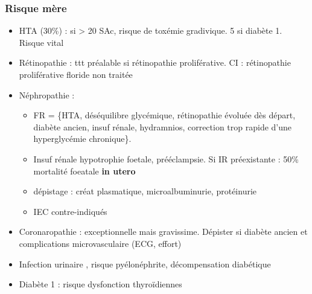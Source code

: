 \documentclass{book}
\begin{document}
\subsubsection{Risque mère}
\label{sec:org6f3645c}
\begin{itemize}
\item HTA (30\%) : si > 20 SAc, risque de toxémie gradivique. \texttimes{}5 si
diabète 1. Risque vital \faBomb
\item Rétinopathie : ttt préalable si rétinopathie proliférative. CI : rétinopathie
proliférative floride non traitée
\item Néphropathie : 
\begin{itemize}
\item FR = \{HTA, déséquilibre glycémique, rétinopathie évoluée dès
départ, diabète ancien, insuf rénale, hydramnios, correction trop rapide d'une
hyperglycémie chronique\}.
\item Insuf rénale \thus hypotrophie foetale, prééclampsie. Si IR préexistante : 50\%
mortalité foeatale \textbf{in utero}
\item dépistage : créat plasmatique, microalbuminurie, protéinurie
\item IEC contre-indiqués
\end{itemize}
\item Coronaropathie : exceptionnelle mais gravissime. Dépister si diabète ancien et
complications microvasculaire (ECG, effort)
\item Infection urinaire \inc, risque pyélonéphrite, décompensation diabétique
\item Diabète 1 : \inc risque dysfonction thyroïdiennes
\end{itemize}
\end{document}
